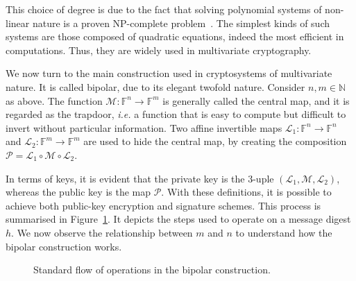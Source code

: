 \documentclass[openright]{report}
\begin{document}
This choice of degree is due to the fact that solving polynomial systems of non-linear nature is a proven NP-complete problem~\cite[Theorem 10]{Fraenkel:197909:article}. The simplest kinds of such systems are those composed of quadratic equations, indeed the most efficient in computations. Thus, they are widely used in multivariate cryptography.

We now turn to the main construction used in cryptosystems of multivariate nature. It is called bipolar, due to its elegant twofold nature. Consider $n, m \in \mathbb{N}$ as above. The function $\mathcal{M}: \mathbb{F}^{n} \to \mathbb{F}^{m}$ is generally called the central map, and it is regarded as the trapdoor, \emph{i.e.} a function that is easy to compute but difficult to invert without particular information. Two affine invertible maps $\mathcal{L}_{1} : \mathbb{F}^{n} \to \mathbb{F}^{n}$ and $\mathcal{L}_{2} : \mathbb{F}^{m} \to \mathbb{F}^{m}$ are used to hide the central map, by creating the composition $\mathcal{P} = \mathcal{L}_{1} \circ \mathcal{M} \circ \mathcal{L}_{2}$.

In terms of keys, it is evident that the private key is the $3$-uple $(\mathcal{L}_{1}, \mathcal{M}, \mathcal{L}_{2})$, whereas the public key is the map $\mathcal{P}$. With these definitions, it is possible to achieve both public-key encryption and signature schemes. 
This process is summarised in Figure~\ref{fig:2}. It depicts the steps used to operate on a message digest $h$. We now observe the relationship between $m$ and $n$ to understand how the bipolar construction works.

\begin{figure}[htbp]
  \centering
  \caption{Standard flow of operations in the bipolar construction.}\label{fig:2}
\end{figure}
\end{document}
